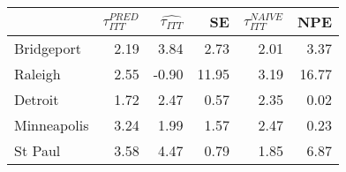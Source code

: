 
\begin{tabular}{lrrrrr}
\toprule
  & $\tau_{ITT}^{PRED}$ & $\hat{\tau_{ITT}}$ & SE & $\tau_{ITT}^{NAIVE}$ & NPE\\
\midrule
Bridgeport & 2.19 & 3.84 & 2.73 & 2.01 & 3.37\\
Raleigh & 2.55 & -0.90 & 11.95 & 3.19 & 16.77\\
Detroit & 1.72 & 2.47 & 0.57 & 2.35 & 0.02\\
Minneapolis & 3.24 & 1.99 & 1.57 & 2.47 & 0.23\\
St Paul & 3.58 & 4.47 & 0.79 & 1.85 & 6.87\\
\bottomrule
\end{tabular}